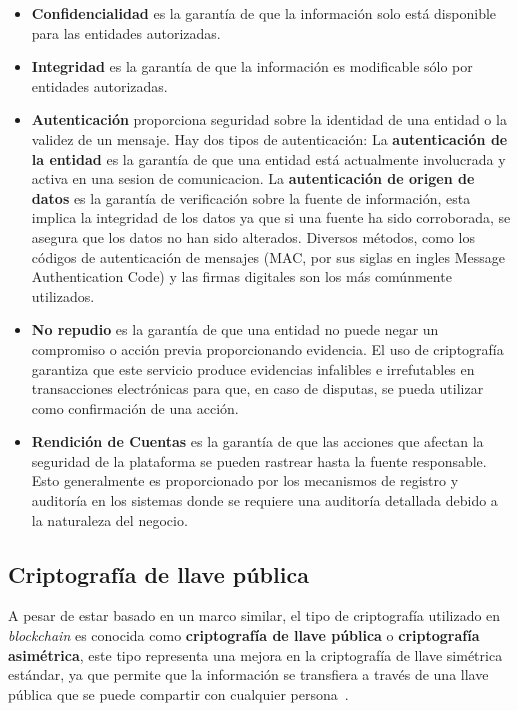 \begin{itemize}
    \item \textbf{Confidencialidad} es la garantía de que la información solo está disponible para las entidades autorizadas.
    \item \textbf{Integridad} es la garantía de que la información es modificable sólo por entidades autorizadas.
    \item \textbf{Autenticación} proporciona seguridad sobre la identidad de una entidad o la validez de un mensaje. Hay dos tipos de autenticación:
    La \textbf{autenticación de la entidad} es la garantía de que una entidad está actualmente involucrada y activa en una sesion de comunicacion.
    La \textbf{autenticación de origen de datos}  es la garantía de verificación sobre la fuente de información, esta  implica la integridad de los datos ya que si  una fuente ha sido corroborada, se asegura que los datos no han sido alterados. Diversos métodos, como los códigos de autenticación de mensajes (MAC, por sus siglas en ingles  Message Authentication Code) y las firmas digitales son los más comúnmente utilizados.
    \item \textbf{No repudio}  es la  garantía de que una entidad no puede negar un compromiso o acción previa proporcionando evidencia. El uso de criptografía garantiza que este servicio produce evidencias infalibles e irrefutables  en transacciones electrónicas para que, en caso de disputas, se pueda utilizar como confirmación de una acción.
    \item \textbf{Rendición de Cuentas} es la garantía de que las acciones que afectan la seguridad de la plataforma se pueden rastrear hasta la fuente responsable. Esto generalmente es proporcionado por los mecanismos de registro y auditoría en los sistemas donde se requiere una auditoría detallada debido a la naturaleza del negocio.
\end{itemize}
 
\subsection {Criptografía de llave pública}

A pesar de estar basado en un marco similar, el tipo de criptografía utilizado en \textit{blockchain} es conocida como \textbf{criptografía de llave pública} o \textbf{criptografía asimétrica}, este tipo representa una mejora en la criptografía de llave simétrica estándar, ya que permite que la información se transfiera a través de una llave pública que se puede compartir con cualquier persona~\cite{liskacademy:blockchainCryptographyExplained}.

